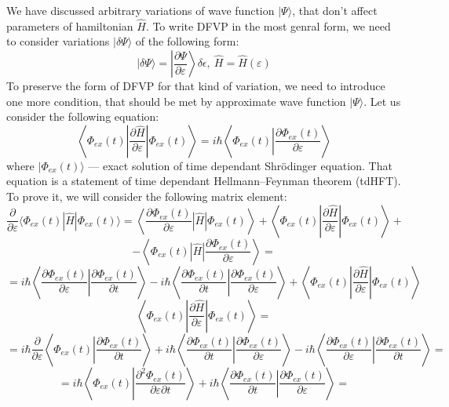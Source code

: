 We have discussed arbitrary variations of wave function $|\Psi\rangle$, that don't affect parameters of hamiltonian $\hat{H}$.
To write DFVP in the most genral form, we need to consider variations $|\delta\Psi\rangle$ of the following form:
$$|\delta\Psi\rangle=\left|\frac{\partial\Psi}{\partial\varepsilon}\right\rangle\delta\epsilon,\ \hat{H}=\hat{H}(\varepsilon)$$
To preserve the form of DFVP for that kind of variation, we need to introduce one more condition, 
that should be met by approximate wave function $|\Psi\rangle$.
Let us consider the following equation:
$$\left\langle\Phi_{ex}(t)\left|\frac{\partial\hat{H}}{\partial\varepsilon}\right|\Phi_{ex}(t)\right\rangle = %
  i\hbar\left\langle\Phi_{ex}(t)\left|\frac{\partial\Phi_{ex}(t)}{\partial\varepsilon}\right.\right\rangle$$
where $|\Phi_{ex}(t)\rangle$ --- exact solution of time dependant Shr\"{o}dinger equation.
That equation is a statement of time dependant Hellmann--Feynman theorem (tdHFT). 
To prove it, we will consider the following matrix element:
$$\frac{\partial}{\partial\varepsilon}\langle\Phi_{ex}(t)|\hat{H}|\Phi_{ex}(t)\rangle=%
				      \left\langle\frac{\partial\Phi_{ex}(t)}{\partial\varepsilon}\left|\hat{H}\right|\Phi_{ex}(t)\right\rangle+%
				      \left\langle\Phi_{ex}(t)\left|\frac{\partial\hat{H}}{\partial\varepsilon}\right|\Phi_{ex}(t)\right\rangle+$$
$$ 				     -\left\langle\Phi_{ex}(t)\left|\hat{H}\right|\frac{\partial\Phi_{ex}(t)}{\partial\varepsilon}\right\rangle=$$
$$=i\hbar\left\langle\frac{\partial\Phi_{ex}(t)}{\partial\varepsilon}\left|\frac{\partial\Phi_{ex}(t)}{\partial t}\right.\right\rangle-%
   i\hbar\left\langle\frac{\partial\Phi_{ex}(t)}{\partial t}\left|\frac{\partial\Phi_{ex}(t)}{\partial\varepsilon}\right.\right\rangle+
   \left\langle\Phi_{ex}(t)\left|\frac{\partial\hat{H}}{\partial\varepsilon}\right|\Phi_{ex}(t)\right\rangle$$
$$\left\langle\Phi_{ex}(t)\left|\frac{\partial\hat{H}}{\partial\varepsilon}\right|\Phi_{ex}(t)\right\rangle=$$
$$=i\hbar\frac{\partial}{\partial\varepsilon}\left\langle\Phi_{ex}(t)\left|\frac{\partial\Phi_{ex}(t)}{\partial t}\right.\right\rangle+%
   i\hbar\left\langle\frac{\partial\Phi_{ex}(t)}{\partial t}\left|\frac{\partial\Phi_{ex}(t)}{\partial\varepsilon}\right.\right\rangle-%
   i\hbar\left\langle\frac{\partial\Phi_{ex}(t)}{\partial\varepsilon}\left|\frac{\partial\Phi_{ex}(t)}{\partial t}\right.\right\rangle=$$
$$=i\hbar\left\langle\Phi_{ex}(t)\left|\frac{\partial^2\Phi_{ex}(t)}{\partial\varepsilon\partial t}\right.\right\rangle+%
   i\hbar\left\langle\frac{\partial\Phi_{ex}(t)}{\partial t}\left|\frac{\partial\Phi_{ex}(t)}{\partial\varepsilon}\right.\right\rangle=$$
